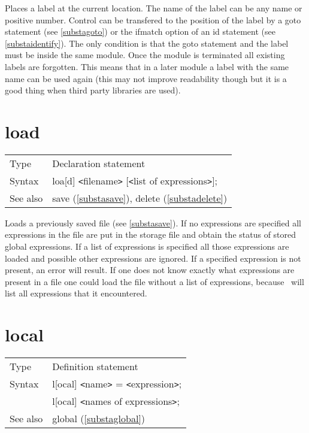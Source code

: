 \noindent Places a label at the current location. The name of 
the label can be any name or positive number. Control can be transfered to the 
position of the label by a goto statement (see 
\ref{substagoto}) or the ifmatch option of an id statement 
(see \ref{substaidentify}). The only condition is that the goto statement 
and the label must be inside the same module. Once the module is terminated 
all existing labels are forgotten. This means that in a later module a 
label with the same name can be used again (this may not improve 
readability though but it is a good thing when third party libraries are 
used). \vspace{10mm}


\section{load}
\label{substaload}

\noindent \begin{tabular}{ll}
Type & Declaration statement\\
Syntax & loa[d] {\tt<}filename{\tt>} [{\tt<}list of expressions{\tt>}];
\\ See also & save (\ref{substasave}), delete (\ref{substadelete})
\end{tabular} \vspace{4mm}

\noindent Loads a previously saved 
file (see \ref{substasave}). If no expressions are 
specified all expressions in the file are put in the storage 
file and obtain the status of stored global 
expressions. If a list of expressions is specified all those expressions 
are loaded and possible other expressions are ignored. If a specified 
expression is not present, an error will result. If one does not know 
exactly what expressions are present in a file one could load the file 
without a list of expressions, because \FORM\ will list all expressions that 
it encountered. \vspace{10mm}

 
\section{local}
\label{substalocal}

\noindent \begin{tabular}{ll}
Type & Definition statement\\
Syntax & l[ocal] {\tt<}name{\tt>} = {\tt<}expression{\tt>}; \\
       & l[ocal] {\tt<}names of expressions{\tt>};
\\ See also & global (\ref{substaglobal})
\end{tabular} \vspace{4mm}

